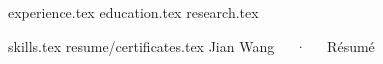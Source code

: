 \documentclass{awesome-cv}
\newcommand*{\sectiondir}{resume/}
\begin{document}
\makecvheader



{experience.tex}
{education.tex}
{research.tex}

{skills.tex}
 {\sectiondir}{certificates.tex}
\makecvfooter
  {}
  {Jian Wang~~~·~~~Résumé}
  {}
\end{document}
